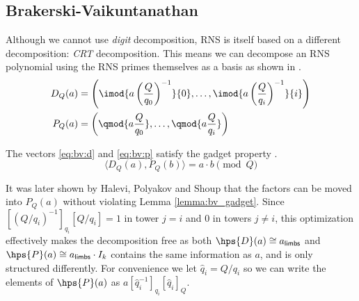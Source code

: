 
\subsection{Brakerski-Vaikuntanathan}
Although we cannot use \textit{digit} decomposition, RNS is itself based on a different decomposition: \textit{CRT} decomposition. This means we can decompose an RNS polynomial using the RNS primes themselves as a basis as shown in \cite{cryptoeprint:2016/510, cryptoeprint:2021/204}. %
\begin{align}
    \label{eq:bv:d}
    D_{Q}({a}) &= \left(\imod{a\left(\frac{Q}{q_0}\right)^{-1}}{0},\dots,\imod{a\left(\frac{Q}{q_i}\right)^{-1}}{i}\right) \\
    \label{eq:bv:p}
    P_{Q}({a}) &= \left(\qmod{a\frac{Q}{q_0}},\dots,\qmod{a\frac{Q}{q_i}}\right)
\end{align}

\begin{lemma}
    \label{lemma:bv_gadget}
    The vectors \eqref{eq:bv:d} and \eqref{eq:bv:p} satisfy the gadget property \textcolor{red}{\autocite{cryptoeprint:2021/204}}.
    \begin{equation}
        \langle D_Q(a), P_Q(b)\rangle = a\cdot b \pmod{Q}
    \end{equation}
\end{lemma}

It was later shown by Halevi, Polyakov and Shoup \cite{cryptoeprint:2018/117} that the factors can be moved into $P_Q(a)$ without violating Lemma \ref{lemma:bv_gadget}. Since $[(Q/q_i)^{-1}]_{q_i}[Q/q_i] = 1$ in tower $j = i$ and 0 in towers $j\not= i$, this optimization effectively makes the decomposition free as both $\hps{D}(a) \cong a_\mathsf{limbs}$ and $\hps{P}(a) \cong a_{\mathsf{limbs}}\cdot I_k$ contains the same information as $a$, and is only structured differently. For convenience we let $\hat{q}_i = {Q}/{q_i}$ so we can write the elements of $\hps{P}(a)$ as $a[\hat{q}_i^{-1}]_{q_i} [\hat{q}_i]_{Q}$.

